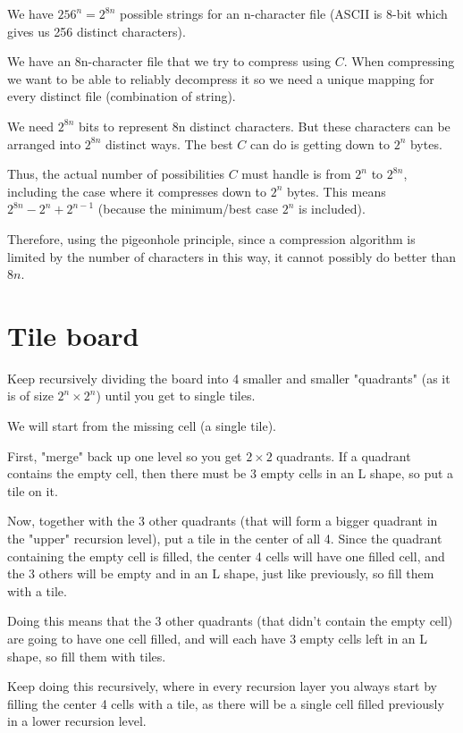 \documentclass[11pt,letterpaper]{article}
\begin{document}
		We have $256^n = 2^{8n}$ possible strings for an n-character file (ASCII is 8-bit which gives us 256 distinct characters).
		
		We have an 8n-character file that we try to compress using $C$.
		When compressing we want to be able to reliably decompress it so we need a unique mapping for every distinct file (combination of string).
		
		We need $2^{8n}$ bits to represent 8n distinct characters.
		But these characters can be arranged into $2^{8n}$ distinct ways.
		The best $C$ can do is getting down to $2^n$ bytes.
		
		Thus, the actual number of possibilities $C$ must handle is from $2^n$ to $2^{8n}$, including the case where it compresses down to $2^n$ bytes.
		This means $2^{8n} - 2^n + 2^{n-1}$ (because the minimum/best case $2^n$ is included).
		
		Therefore, using the pigeonhole principle, since a compression algorithm is limited by the number of characters in this way, it cannot possibly do better than $8n$.
		
	\section{Tile board}
		Keep recursively dividing the board into 4 smaller and smaller "quadrants" (as it is of size $2^n \times 2^n$) until you get to single tiles.
		
		We will start from the missing cell (a single tile).
		
		First, "merge" back up one level so you get $2 \times 2$ quadrants.
		If a quadrant contains the empty cell, then there must be 3 empty cells in an L shape, so put a tile on it.
		
		Now, together with the 3 other quadrants (that will form a bigger quadrant in the "upper" recursion level), put a tile in the center of all 4.
		Since the quadrant containing the empty cell is filled, the center 4 cells will have one filled cell, and the 3 others will be empty and in an L shape, just like previously, so fill them with a tile.
		
		Doing this means that the 3 other quadrants (that didn't contain the empty cell) are going to have one cell filled, and will each have 3 empty cells left in an L shape, so fill them with tiles.
		
		Keep doing this recursively, where in every recursion layer you always start by filling the center 4 cells with a tile, as there will be a single cell filled previously in a lower recursion level.
		
\end{document}
